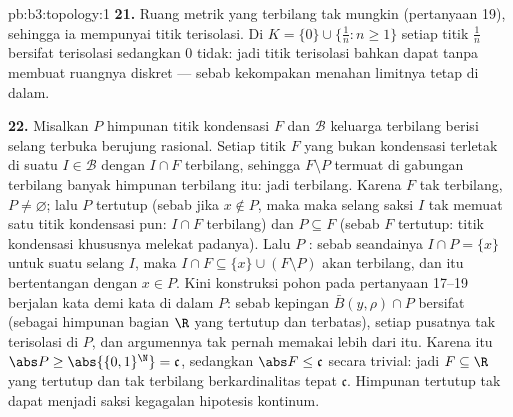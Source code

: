 \begin{solution}{pb:b3:topology:1}
\textbf{21.} Ruang metrik  yang terbilang tak mungkin
 (pertanyaan 19), sehingga ia mempunyai titik terisolasi. Di $K =
\{0\}\cup\{\frac1n : n \geq 1\}$ setiap titik $\frac1n$ bersifat
terisolasi sedangkan $0$ tidak: jadi titik terisolasi bahkan dapat 
tanpa membuat ruangnya diskret --- sebab kekompakan menahan
limitnya tetap di dalam.

\textbf{22.} Misalkan $P$ himpunan titik kondensasi $F$
dan $\mathcal B$ keluarga terbilang berisi selang terbuka
berujung rasional. Setiap titik $F$ yang bukan kondensasi terletak
di suatu $I \in \mathcal B$ dengan $I \cap F$ terbilang, sehingga $F
\setminus P$ termuat di gabungan terbilang banyak himpunan
terbilang itu: jadi terbilang. Karena $F$ tak terbilang,
$P \neq \varnothing$; lalu $P$ tertutup (sebab jika $x \notin P$, maka
maka selang saksi $I$ tak memuat satu titik kondensasi pun:
$I \cap F$ terbilang) dan $P \subseteq F$ (sebab $F$ tertutup:
titik kondensasi khususnya melekat padanya). Lalu $P$
: sebab seandainya $I \cap P = \{x\}$ untuk suatu selang $I$, maka
$I \cap F \subseteq \{x\} \cup (F \setminus P)$ akan
terbilang, dan itu bertentangan dengan $x \in P$. Kini konstruksi pohon
pada pertanyaan 17--19 berjalan kata demi kata di dalam $P$: sebab kepingan
$\bar B(y, \rho) \cap P$ bersifat  (sebagai himpunan bagian $\R$ yang tertutup dan terbatas),
setiap pusatnya tak terisolasi di $P$, dan
argumennya tak pernah memakai lebih dari itu. Karena itu $\abs P \geq
\abs{\{0,1\}^\N} = \mathfrak c$, sedangkan $\abs F \leq \mathfrak
c$ secara trivial: jadi $F \subseteq \R$ yang tertutup dan tak terbilang
berkardinalitas tepat $\mathfrak c$. Himpunan tertutup tak dapat
menjadi saksi kegagalan hipotesis kontinum.


\end{solution}

